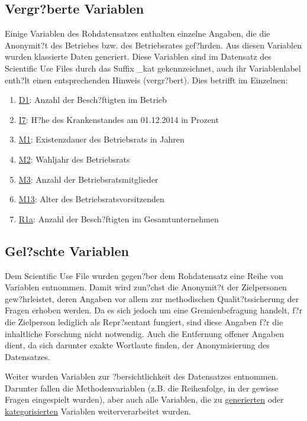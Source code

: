 \subsection{Vergr?berte Variablen}\label{var_kategorisiert}

Einige Variablen des Rohdatensatzes enthalten einzelne Angaben, die die Anonymit?t des Betriebes bzw. des Betriebsrates gef?hrden. Aus diesen Variablen wurden klassierte Daten generiert. Diese Variablen sind im Datensatz des Scientific Use Files durch das Suffix \glqq \_kat \grqq\xspace gekennzeichnet, auch ihr Variablenlabel enth?lt einen entsprechenden Hinweis (\grqq vergr?bert\grqq ). Dies betrifft im Einzelnen:

\begin{enumerate}

\item \hyperref[var:D1]{D1}: Anzahl der Besch?ftigten im Betrieb 
\item \hyperref[var:I7]{I7}: H?he des Krankenstandes am 01.12.2014 in Prozent
\item \hyperref[var:M1]{M1}: Existenzdauer des Betriebsrats in Jahren
\item \hyperref[var:M2]{M2}: Wahljahr des Betriebsrats
\item \hyperref[var:M3]{M3}: Anzahl der Betriebsratsmitglieder
\item \hyperref[var:M13]{M13}: Alter des Betriebsratsvorsitzenden
\item \hyperref[var:R1a]{R1a}: Anzahl der Besch?ftigten im Gesamtunternehmen

\end{enumerate}

\subsection{Gel?schte Variablen}\label{var_geloescht}

Dem Scientific Use File wurden gegen?ber dem Rohdatensatz eine Reihe von Variablen entnommen. Damit wird zun?chst die Anonymit?t der Zielpersonen gew?hrleistet, deren Angaben vor allem zur methodischen Qualit?tssicherung der Fragen erhoben werden. Da es sich jedoch um eine Gremienbefragung handelt, f?r die Zielperson lediglich als Repr?sentant fungiert, sind diese Angaben f?r die inhaltliche Forschung nicht notwendig. Auch die Entfernung offener Angaben dient, da sich darunter exakte Wortlaute finden, der Anonymisierung des Datensatzes. 

Weiter wurden Variablen zur ?bersichtlichkeit des Datensatzes entnommen. Darunter fallen die Methodenvariablen (z.B. die Reihenfolge, in der gewisse Fragen eingespielt wurden), aber auch alle Variablen, die zu \hyperref[var_generiert]{generierten} oder \hyperref[var_kategorisiert]{kategorisierten} Variablen weiterverarbeitet wurden.

